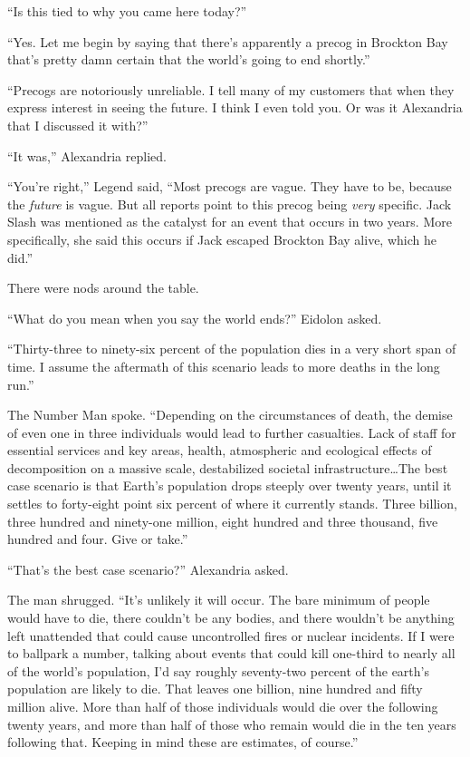 ``Is this tied to why you came here today?''



``Yes.  Let me begin by saying that there's apparently a precog in Brockton Bay that's pretty damn certain that the world's going to end shortly.''



``Precogs are notoriously unreliable.  I tell many of my customers that when they express interest in seeing the future.  I think I even told you.  Or was it Alexandria that I discussed it with?''



``It was,'' Alexandria replied.



``You're right,'' Legend said, ``Most precogs are vague.  They have to be, because the \emph{future} is vague.  But all reports point to this precog being \emph{very} specific.  Jack Slash was mentioned as the catalyst for an event that occurs in two years.  More specifically, she said this occurs if Jack escaped Brockton Bay alive, which he did.''



There were nods around the table.



``What do you mean when you say the world ends?'' Eidolon asked.



``Thirty-three to ninety-six percent of the population dies in a very short span of time.  I assume the aftermath of this scenario leads to more deaths in the long run.''



The Number Man spoke.  ``Depending on the circumstances of death, the demise of even one in three individuals would lead to further casualties.  Lack of staff for essential services and key areas, health, atmospheric and ecological effects of decomposition on a massive scale, destabilized societal infrastructure\ldots The best case scenario is that Earth's population drops steeply over twenty years, until it settles to forty-eight point six percent of where it currently stands.  Three billion, three hundred and ninety-one million, eight hundred and three thousand, five hundred and four.  Give or take.''



``That's the best case scenario?'' Alexandria asked.



The man shrugged.  ``It's unlikely it will occur.  The bare minimum of people would have to die, there couldn't be any bodies, and there wouldn't be anything left unattended that could cause uncontrolled fires or nuclear incidents.  If I were to ballpark a number, talking about events that could kill one-third to nearly all of the world's population, I'd say roughly seventy-two percent of the earth's population are likely to die.  That leaves one billion, nine hundred and fifty million alive.  More than half of those individuals would die over the following twenty years, and more than half of those who remain would die in the ten years following that.  Keeping in mind these are estimates, of course.''



